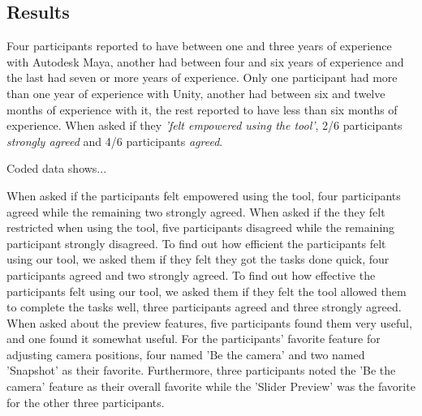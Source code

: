 \subsection{Results} \label{results}
Four participants reported to have between one and three years of experience with Autodesk Maya, another had between four and six years of experience and the last had seven or more years of experience. Only one participant had more than one year of experience with Unity, another had between six and twelve months of experience with it, the rest reported to have less than six months of experience.
When asked if they \textit{'felt empowered using the tool'}, 2/6 participants \textit{strongly agreed} and 4/6 participants \textit{agreed}.

Coded data shows...



When asked if the participants felt empowered using the tool, four participants agreed while the remaining two strongly agreed. When asked if the they felt restricted when using the tool, five participants disagreed while the remaining participant strongly disagreed. To find out how efficient the participants felt using our tool, we asked them if they felt they got the tasks done quick, four participants agreed and two strongly agreed. To find out how effective the participants felt using our tool, we asked them if they felt the tool allowed them to complete the tasks well, three participants agreed and three strongly agreed.
When asked about the preview features, five participants found them very useful, and one found it somewhat useful. For the participants' favorite feature for adjusting camera positions, four named 'Be the camera' and two named 'Snapshot' as their favorite. Furthermore, three participants noted the 'Be the camera' feature as their overall favorite while the 'Slider Preview' was the favorite for the other three participants. 